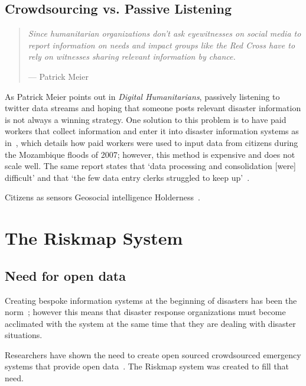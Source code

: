 \subsection{Crowdsourcing vs. Passive Listening}
\begin{quote}
	\textit{Since humanitarian organizations
	don't ask eyewitnesses on social media to report information on needs
	and impact groups like the Red Cross have to rely on witnesses sharing
	relevant information by chance.}
		\begin{flushright}
		--- Patrick Meier~\cite{meierDigitalHumanitariansHow2015}
		\end{flushright}
\end{quote}

As Patrick Meier points out in \textit{Digital Humanitarians}, passively
listening to twitter data streams and hoping that someone posts relevant
disaster information is not always a winning strategy. One solution to this
problem is to have paid workers that collect information and enter it into
disaster information systems as in~\cite{aminDataNaturalDisasters2008}, which
details how paid workers were used to input data from citizens during the
Mozambique floods of 2007; however, this method is expensive and does not scale
well. The same report states that `data processing and consolidation [were]
difficult' and that `the few data entry clerks struggled to keep
up'~\cite{aminDataNaturalDisasters2008}.


Citizens as sensors Geosocial
intelligence Holderness~\cite{holdernessSocialMediaGeoSocial2015a}.

\section{The Riskmap System}\label{chap1:riskmap}

	\subsection{Need for open data}
	Creating bespoke information systems at the beginning of disasters has been the
	norm~\cite{aminDataNaturalDisasters2008}; however this
	means that disaster response organizations must become acclimated with the
	system at the same time that they are dealing with disaster situations. 
	
	Researchers have shown the need to create open sourced crowdsourced emergency systems
	that provide open data~\cite{avvenutiNeedOpeningCrowdsourced2018a}. The
	Riskmap system was created to fill that need.

